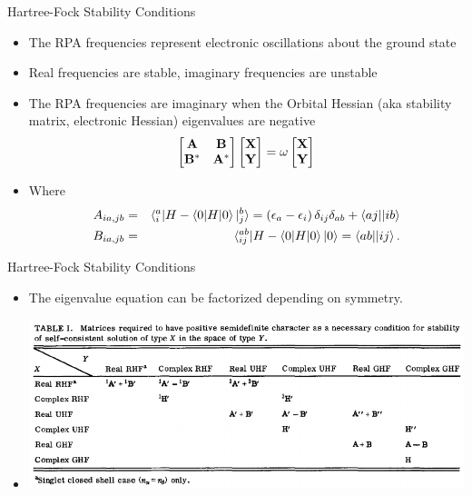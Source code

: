 \documentclass[10pt]{beamer}
\begin{document}
{{{{{{\begin{frame}{Hartree-Fock Stability Conditions}
	\begin{itemize}[<+->]
		\item{The RPA frequencies represent electronic oscillations about the ground state}
		\item{Real frequencies are stable, imaginary frequencies are unstable}
		\item{The RPA frequencies are imaginary when the \alert{Orbital Hessian} (aka stability matrix, electronic Hessian) eigenvalues are negative
			\begin{eqnarray}
				\begin{bmatrix}
					\bf{A}   & \bf{B}   \\
					\bf{B}^* & \bf{A}^* \\
				\end{bmatrix}
				\begin{bmatrix}  \bf{X} \\ \bf{Y}  \end{bmatrix}
				= \omega \begin{bmatrix}  \bf{X} \\ \bf{Y}  \end{bmatrix}
			\end{eqnarray}
		}
		\item{Where}
		\begin{eqnarray}
			A_{ia,jb} &=& \braket{{}_i^a|H-\braket{0|H|0}|{}_j^b} = \left(\epsilon_a - \epsilon_i \right) \delta_{ij}\delta_{ab} + \braket{aj||ib}
			\nonumber \\
			B_{ia,jb} &=& \braket{{}_{ij}^{ab}|H-\braket{0|H|0}|0} = \braket{ab||ij}.
		\end{eqnarray}
	\end{itemize}
\end{frame}


\begin{frame}{Hartree-Fock Stability Conditions}
	\begin{itemize}
		\item[]{The eigenvalue equation can be factorized depending on symmetry.}
		\item[]{\includegraphics[width=\linewidth]{../images/seeger_stability.pdf} }
	\end{itemize}
\end{frame}

}}}}}}
\end{document}
